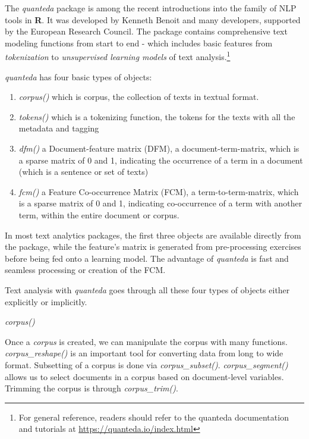 \documentclass[
]{article}
\providecommand{\tightlist}{%
  \setlength{\itemsep}{0pt}\setlength{\parskip}{0pt}}
\begin{document}
The \emph{quanteda} package is among the recent introductions into the family of NLP tools in \textbf{R}. It was developed by Kenneth Benoit and many developers, supported by the European Research Council\citep{quanteda}. The package contains comprehensive text modeling functions from start to end - which includes basic features from \emph{tokenization} to \emph{unsupervised learning models} of text analysis.\footnote{For general reference, readers should refer to the quanteda documentation and tutorials at \url{https://quanteda.io/index.html}}

\emph{quanteda} has four basic types of objects:

\begin{enumerate}
\def\labelenumi{\arabic{enumi}.}
\tightlist
\item
  \emph{corpus()} which is corpus, the collection of texts in textual format.
\item
  \emph{tokens()} which is a tokenizing function, the tokens for the texts with all the metadata and tagging
\item
  \emph{dfm()} a Document-feature matrix (DFM), a document-term-matrix, which is a sparse matrix of 0 and 1, indicating the occurrence of a term in a document (which is a sentence or set of texts)
\item
  \emph{fcm()} a Feature Co-occurrence Matrix (FCM), a term-to-term-matrix, which is a sparse matrix of 0 and 1, indicating co-occurrence of a term with another term, within the entire document or corpus.
\end{enumerate}

In most text analytics packages, the first three objects are available directly from the package, while the feature's matrix is generated from pre-processing exercises before being fed onto a learning model. The advantage of \emph{quanteda} is fast and seamless processing or creation of the FCM.

Text analysis with \emph{quanteda} goes through all these four types of objects either explicitly or implicitly.

\emph{corpus()}

Once a \emph{corpus} is created, we can manipulate the corpus with many functions. \emph{corpus\_reshape()} is an important tool for converting data from long to wide format. Subsetting of a corpus is done via \emph{corpus\_subset()}. \emph{corpus\_segment()} allows us to select documents in a corpus based on document-level variables. Trimming the corpus is through \emph{corpus\_trim()}.
\end{document}

